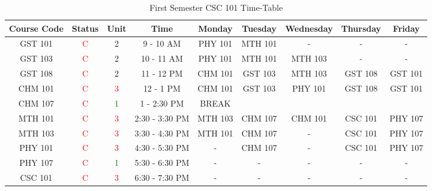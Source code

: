 \documentclass{article}
\begin{document}
	\begin{sidewaystable}[h!]
		\begin{center}
			\caption{First Semester CSC 101 Time-Table}
				\hline
			\label{tab:table1}
			 \begin{tabular}{|c|c|c|c|c|c|c|c|c|}
				\hline
				\cellcolor{purple!20}\textbf{Course Code} & \cellcolor{purple!20}\textbf{Status} & \cellcolor{purple!20}\textbf{Unit} & \cellcolor{purple!20}\textbf{Time} & \cellcolor{pink!20}\textbf{Monday}& \cellcolor{pink!20}\textbf{Tuesday }& \cellcolor{pink!20}\textbf{Wednesday}& \cellcolor{pink!20}\textbf{Thursday} & \cellcolor{pink!20}\textbf{Friday}\\
				\hline
				\cellcolor{purple!40}GST 101 & \textcolor{red}C & \textcolor{red!50}2 & 9 - 10 AM & PHY 101 & MTH 101 & - & - & - \\
				\cellcolor{purple!40}GST 103 & \textcolor{red}C & \textcolor{red!50}2 & 10 - 11 AM & PHY 101 & MTH 101 & MTH 103 & - & - \\
				\cellcolor{purple!40}GST 108 & \textcolor{red}C & \textcolor{red!50}2 & 11 - 12 PM & CHM 101 & GST 103 & MTH 103 & GST 108 & GST 101 \\
				\cellcolor{purple!40}CHM 101 & \textcolor{red}C & \textcolor{red}3 & 12 - 1 PM & CHM 101 & GST 103 & PHY 101 & GST 108 & GST 101 \\
				\hline
				\cellcolor{purple!40}CHM 107 & \textcolor{red}C & \textcolor{green}1 & 1 - 2:30 PM & \cellcolor{pink!20}BREAK & \cellcolor{pink!20} & \cellcolor{pink!20} & \cellcolor{pink!20} & \cellcolor{pink!20}\\
				\hline
				\cellcolor{purple!40}MTH 101 & \textcolor{red}C & \textcolor{red}3 & 2:30 - 3:30 PM & MTH 103 & CHM 107 & CHM 101 & CSC 101 & PHY 107 \\
				\cellcolor{purple!40}MTH 103 & \textcolor{red}C & \textcolor{red}3 & 3:30 - 4:30 PM & MTH 101 & CHM 107 & - & CSC 101 & PHY 107 \\
				\cellcolor{purple!40}PHY 101 & \textcolor{red}C & \textcolor{red}3 & 4:30 - 5:30 PM & - & CHM 107 & - & CSC 101 & PHY 107 \\
				\cellcolor{purple!40}PHY 107 & \textcolor{red}C & \textcolor{green}1 & 5:30 - 6:30 PM & - & - & - & - & - \\
				\cellcolor{purple!40}CSC 101 & \textcolor{red}C & \textcolor{red}3 & 6:30 - 7:30 PM & - & - & - & - & - \\
				\hline  
			\end{tabular} 
		\end{center}
	\end{sidewaystable}
\end{document}
